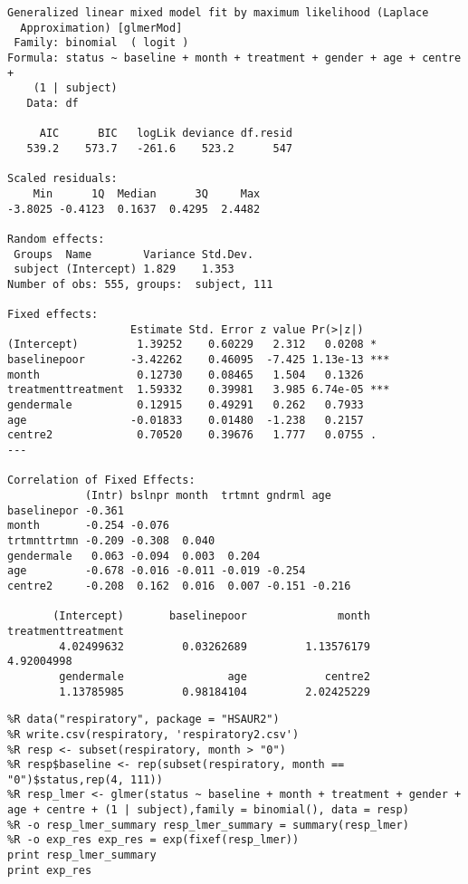 \documentclass[12pt,fleqn]{article}\usepackage{../common}
\begin{document}
\begin{verbatim}
Generalized linear mixed model fit by maximum likelihood (Laplace
  Approximation) [glmerMod]
 Family: binomial  ( logit )
Formula: status ~ baseline + month + treatment + gender + age + centre +  
    (1 | subject)
   Data: df

     AIC      BIC   logLik deviance df.resid 
   539.2    573.7   -261.6    523.2      547 

Scaled residuals: 
    Min      1Q  Median      3Q     Max 
-3.8025 -0.4123  0.1637  0.4295  2.4482 

Random effects:
 Groups  Name        Variance Std.Dev.
 subject (Intercept) 1.829    1.353   
Number of obs: 555, groups:  subject, 111

Fixed effects:
                   Estimate Std. Error z value Pr(>|z|)    
(Intercept)         1.39252    0.60229   2.312   0.0208 *  
baselinepoor       -3.42262    0.46095  -7.425 1.13e-13 ***
month               0.12730    0.08465   1.504   0.1326    
treatmenttreatment  1.59332    0.39981   3.985 6.74e-05 ***
gendermale          0.12915    0.49291   0.262   0.7933    
age                -0.01833    0.01480  -1.238   0.2157    
centre2             0.70520    0.39676   1.777   0.0755 .  
---

Correlation of Fixed Effects:
            (Intr) bslnpr month  trtmnt gndrml age   
baselinepor -0.361                                   
month       -0.254 -0.076                            
trtmnttrtmn -0.209 -0.308  0.040                     
gendermale   0.063 -0.094  0.003  0.204              
age         -0.678 -0.016 -0.011 -0.019 -0.254       
centre2     -0.208  0.162  0.016  0.007 -0.151 -0.216

       (Intercept)       baselinepoor              month treatmenttreatment 
        4.02499632         0.03262689         1.13576179         4.92004998 
        gendermale                age            centre2 
        1.13785985         0.98184104         2.02425229 

\end{verbatim}

\begin{verbatim}
%R data("respiratory", package = "HSAUR2")
%R write.csv(respiratory, 'respiratory2.csv')
%R resp <- subset(respiratory, month > "0")
%R resp$baseline <- rep(subset(respiratory, month == "0")$status,rep(4, 111))
%R resp_lmer <- glmer(status ~ baseline + month + treatment + gender + age + centre + (1 | subject),family = binomial(), data = resp)
%R -o resp_lmer_summary resp_lmer_summary = summary(resp_lmer)
%R -o exp_res exp_res = exp(fixef(resp_lmer))
print resp_lmer_summary
print exp_res
\end{verbatim}
\end{document}
